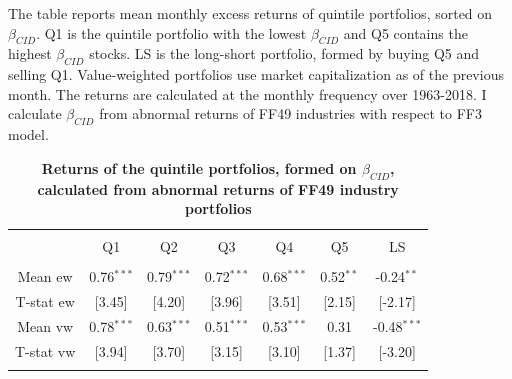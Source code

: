 \documentclass[12pt]{article}
\begin{document}
\begin{table}[!htbp] \centering 
  \caption{\textbf{Returns of the quintile portfolios, formed on $\beta_{CID}$, calculated from abnormal returns of FF49 industry portfolios}} 
  \label{} 
    \begin{flushleft}
    {\medskip\small
 The table reports mean monthly excess returns of quintile portfolios, sorted on $\beta_{CID}$. Q1 is the quintile portfolio with the lowest $\beta_{CID}$ and Q5 contains the highest $\beta_{CID}$ stocks. LS is the long-short portfolio, formed by buying Q5 and selling Q1. Value-weighted portfolios use market capitalization as of the previous month. The returns are calculated at the monthly frequency over 1963-2018. I calculate $\beta_{CID}$ from abnormal returns of FF49 industries with respect to FF3 model.}
    \medskip
    \end{flushleft}
\begin{tabular}{@{\extracolsep{5pt}} ccccccc} 
\\[-1.8ex]\hline 
\hline \\[-1.8ex] 
 & Q1 & Q2 & Q3 & Q4 & Q5 & LS \\ 
\hline \\[-1.8ex] 
Mean ew & 0.76$^{***}$ & 0.79$^{***}$ & 0.72$^{***}$ & 0.68$^{***}$ & 0.52$^{**}$ & -0.24$^{**}$ \\ 
T-stat ew & [3.45] & [4.20] & [3.96] & [3.51] & [2.15] & [-2.17] \\ 
Mean vw & 0.78$^{***}$ & 0.63$^{***}$ & 0.51$^{***}$ & 0.53$^{***}$ & 0.31 & -0.48$^{***}$ \\ 
T-stat vw & [3.94] & [3.70] & [3.15] & [3.10] & [1.37] & [-3.20] \\ 
\hline \\[-1.8ex] 
\end{tabular}
\end{table}
\end{document}
